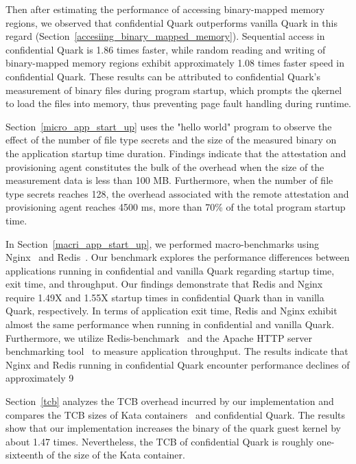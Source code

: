 Then after estimating the performance of accessing binary-mapped memory regions, we observed that confidential Quark outperforms vanilla Quark in this regard (Section~\ref{accesiing_binary_mapped_memory}). Sequential access in confidential Quark is 1.86 times faster, while random reading and 
writing of binary-mapped memory regions exhibit approximately 1.08 times faster speed in confidential Quark. These results can be attributed to confidential Quark's measurement of binary files during program startup, which prompts the qkernel to load the files into memory, thus preventing 
page fault handling during runtime.

Section~\ref{micro_app_start_up} uses the "hello world" program to observe the effect of the number of file type secrets and the size of the measured binary on the application startup time duration. Findings indicate that the attestation and provisioning agent constitutes the bulk of the overhead 
when the size of the measurement data is less than 100 MB. Furthermore, when the number of file type secrets reaches 128, the overhead associated with the remote attestation and provisioning agent reaches 4500 ms, more than 70\% of the total program startup time.

In Section~\ref{macri_app_start_up}, we performed macro-benchmarks using Nginx~\cite*{nginx} and Redis~\cite*{redis}. Our benchmark explores the performance differences between applications running in confidential and vanilla Quark regarding startup time, exit time, and throughput. Our 
findings demonstrate that Redis and Nginx require 1.49X and 1.55X startup times in confidential Quark than in vanilla Quark, respectively. In terms of application exit time, Redis and Nginx exhibit almost the same performance when running in confidential and vanilla Quark. Furthermore, we utilize 
Redis-benchmark~\cite*{Redis_benchmark} and the Apache HTTP server benchmarking tool~\cite*{ab} to measure application throughput. The results indicate that Nginx and Redis running in confidential Quark encounter performance declines of approximately 9%

Section~\ref{tcb} analyzes the TCB overhead incurred by our implementation and compares the TCB sizes of Kata containers~\cite*{Kata-Containers} and confidential Quark. The results show that our implementation increases the binary of the quark guest kernel by about 1.47 times. Nevertheless, 
the TCB of confidential Quark is roughly one-sixteenth of the size of the Kata container.


